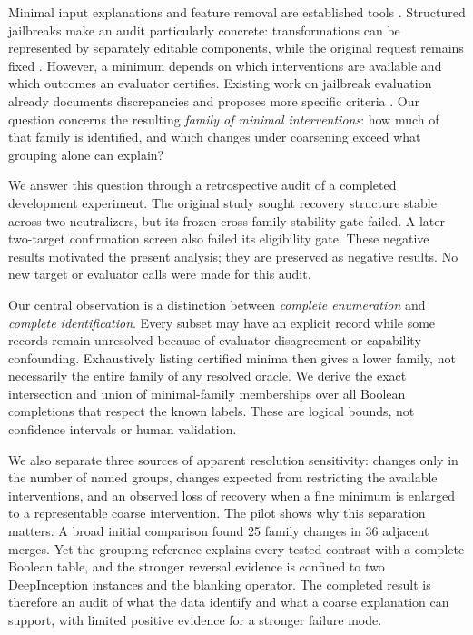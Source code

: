 \documentclass{article}
\begin{document}
Minimal input explanations and feature removal are established tools
\citep{carter2019,covert2021}. Structured jailbreaks make an audit particularly
concrete: transformations can be represented by separately editable components,
while the original request remains fixed
\citep{doumbouya2025,li2023}. However, a minimum depends on which interventions
are available and which outcomes an evaluator certifies. Existing work on
jailbreak evaluation already documents discrepancies and proposes more
specific criteria \citep{huang2026guidedbench,huang2026jailmeter}. Our question
concerns the resulting \emph{family of minimal interventions}: how much of that
family is identified, and which changes under coarsening exceed what grouping
alone can explain?

We answer this question through a retrospective audit of a completed
development experiment. The original study sought recovery structure stable
across two neutralizers, but its frozen cross-family stability gate failed.
A later two-target confirmation screen also failed its eligibility gate.
These negative results motivated the present analysis; they are preserved as
negative results. No new target or evaluator calls were made for this audit.

Our central observation is a distinction between \emph{complete enumeration}
and \emph{complete identification}. Every subset may have an explicit record
while some records remain unresolved because of evaluator disagreement or
capability confounding. Exhaustively listing certified minima then gives a
lower family, not necessarily the entire family of any resolved oracle. We
derive the exact intersection and union of minimal-family memberships over
all Boolean completions that respect the known labels. These are logical
bounds, not confidence intervals or human validation.

We also separate three sources of apparent resolution sensitivity: changes
only in the number of named groups, changes expected from restricting the
available interventions, and an observed loss of recovery when a fine minimum
is enlarged to a representable coarse intervention. The pilot shows why this
separation matters. A broad initial comparison found 25 family changes in 36
adjacent merges. Yet the grouping reference explains every tested contrast
with a complete Boolean table, and the stronger reversal evidence is confined
to two DeepInception instances and the blanking operator. The completed result is therefore an audit of
what the data identify and what a coarse explanation can support, with limited
positive evidence for a stronger failure mode.
\end{document}
